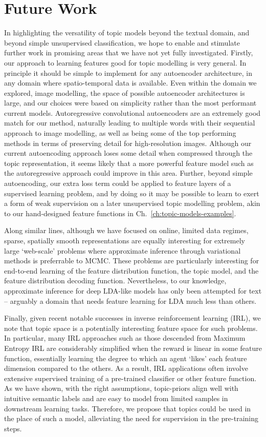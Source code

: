\section{Future Work}
In highlighting the versatility of topic models beyond the textual domain, and beyond simple unsupervised classification, we hope to enable and stimulate further work in promising areas that we have not yet fully investigated. Firstly, our approach to learning features good for topic modelling is very general. In principle it should be simple to implement for any autoencoder architecture, in any domain where spatio-temporal data is available. Even within the domain we explored, image modelling, the space of possible autoencoder architectures is large, and our choices were based on simplicity rather than the most performant current models. Autoregressive convolutional autoencoders are an extremely good match for our method, naturally leading to multiple words with their sequential approach to image modelling, as well as being some of the top performing methods in terms of preserving detail for high-resolution images. Although our current autoencoding approach loses some detail when compressed through the topic representation, it seems likely that a more powerful feature model such as the autoregressive approach could improve in this area. Further, beyond simple autoencoding, our extra loss term could be applied to feature layers of a supervised learning problem, and by doing so it may be possible to learn to exert a form of weak supervision on a later unsupervised topic modelling problem, akin to our hand-designed feature functions in Ch.~\ref{ch:topic-models-examples}.

Along similar lines, although we have focused on online, limited data regimes, sparse, spatially smooth representations are equally interesting for extremely large `web-scale' problems where approximate inference through variational methods is preferrable to MCMC. These problems are particularly interesting for end-to-end learning of the feature distribution function, the topic model, and the feature distribution decoding function. Nevertheless, to our knowledge, approximate inference for deep LDA-like models has only been attempted for text -- arguably a domain that needs feature learning for LDA much less than others.

Finally, given recent notable successes in inverse reinforcement learning (IRL), we note that topic space is a potentially interesting feature space for such problems. In particular, many IRL approaches such as those descended from Maximum Entropy IRL \citep{ziebart2008maximum} are considerably simplified when the reward is linear in some feature function, essentially learning the degree to which an agent `likes' each feature dimension compared to the others. As a result, IRL applications often involve extensive supervised training of a pre-trained classifier or other feature function. As we have shown, with the right assumptions, topic-priors align well with intuitive semantic labels and are easy to model from limited samples in downstream learning tasks. Therefore, we propose that topics could be used in the place of such a model, alleviating the need for supervision in the pre-training steps.


